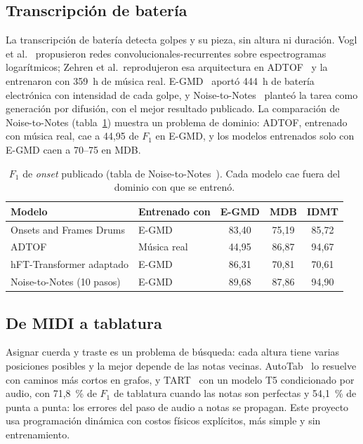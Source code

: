 \documentclass[11pt,a4paper]{article}
\begin{document}
\subsection{Transcripción de batería}
La transcripción de batería detecta golpes y su pieza, sin altura ni duración. Vogl et
al.~\cite{vogl2017} propusieron redes convolucionales-recurrentes sobre espectrogramas logarítmicos;
Zehren et al.\ reprodujeron esa arquitectura en ADTOF~\cite{zehren2023adtof} y la entrenaron con 359~h
de música real. E-GMD~\cite{callender2020egmd} aportó 444~h de batería electrónica con intensidad de
cada golpe, y Noise-to-Notes~\cite{yeung2025n2n} planteó la tarea como generación por difusión, con el
mejor resultado publicado. La comparación de Noise-to-Notes (tabla~\ref{tab:publicados}) muestra un
problema de dominio: ADTOF, entrenado con música real, cae a 44{,}95 de $F_1$ en E-GMD, y los modelos
entrenados solo con E-GMD caen a 70--75 en MDB.

\begin{table}[ht]
\centering
\caption{$F_1$ de \emph{onset} publicado (tabla de Noise-to-Notes~\cite{yeung2025n2n}). Cada modelo cae
fuera del dominio con que se entrenó.}
\label{tab:publicados}
\begin{tabular}{llccc}
\toprule
\textbf{Modelo} & \textbf{Entrenado con} & \textbf{E-GMD} & \textbf{MDB} & \textbf{IDMT} \\
\midrule
Onsets and Frames Drums & E-GMD & 83{,}40 & 75{,}19 & 85{,}72 \\
ADTOF & Música real & 44{,}95 & 86{,}87 & 94{,}67 \\
hFT-Transformer adaptado & E-GMD & 86{,}31 & 70{,}81 & 70{,}61 \\
Noise-to-Notes (10 pasos) & E-GMD & 89{,}68 & 87{,}86 & 94{,}90 \\
\bottomrule
\end{tabular}
\end{table}

\subsection{De MIDI a tablatura}
Asignar cuerda y traste es un problema de búsqueda: cada altura tiene varias posiciones posibles y la
mejor depende de las notas vecinas. AutoTab~\cite{matos2025autotab} lo resuelve con caminos más cortos
en grafos, y TART~\cite{gupta2026tart} con un modelo T5 condicionado por audio, con 71{,}8~\% de $F_1$
de tablatura cuando las notas son perfectas y 54{,}1~\% de punta a punta: los errores del paso de audio
a notas se propagan. Este proyecto usa programación dinámica con costos físicos explícitos, más simple
y sin entrenamiento.
\end{document}

